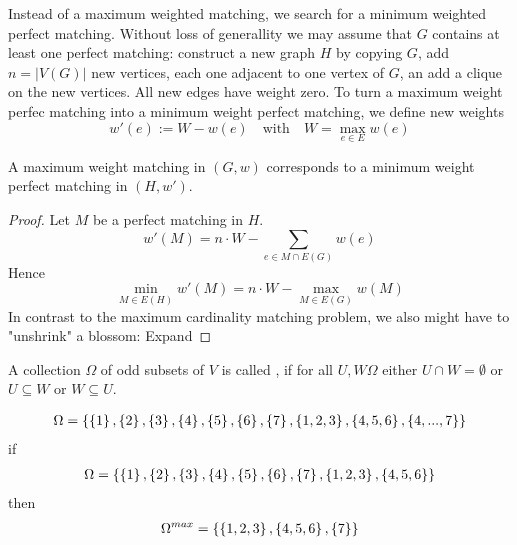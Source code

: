 \begin{lec}[2011-11-24]\end{lec}

Instead of a maximum weighted matching, we search for a minimum weighted perfect matching. Without loss of generallity we may assume that $G$ contains at least one perfect matching: construct a new graph $H$ by copying $G$, add $n=|V(G)|$ new vertices, each one adjacent to one vertex of $G$, an add a clique on the new vertices. All new edges have weight zero. To turn a maximum weight perfec matching into a minimum weight perfect matching, we define new weights  \[w'(e):=W-w(e) \quad\text{with}\quad W = \max_{e\in E} w(e) \]
\begin{lem}
	A maximum weight matching in $(G,w)$ corresponds to a minimum weight perfect matching in $(H,w')$.
\end{lem}

\begin{proof}
	Let $M$ be a perfect matching in $H$.
	\[
		w'(M)= n \cdot W - \sum\limits_{e \in M \cap E(G)} w(e)
	\]
	Hence
	\[ 
		\min_{M \in E(H)} w'(M) = n \cdot W - \max_{M \in E(G)} w(M)
	\]
	In contrast to the maximum cardinality matching problem, we also might have to "unshrink" a blossom: Expand
\end{proof}

\begin{defn}
	 A collection $\Omega$ of odd subsets of $V$ is called , if for all $U,W \Omega$ either $U\cap W = \emptyset$ or $U \subseteq W$ or $W \subseteq U$.
\end{defn}

\begin{xmp+}
	\begin{align*}
		\Omega =  \left\{\left\{1\right\}, \left\{2\right\}, \left\{3\right\}, \left\{4\right\}, \left\{5\right\}, \left\{6\right\}, \left\{7\right\}, \left\{1,2,3\right\}, \left\{4,5,6\right\}, \left\{4, ..., 7\right\}\right\}
	\end{align*}
	if
	\begin{align*}
		\Omega =  \left\{\left\{1\right\}, \left\{2\right\}, \left\{3\right\}, \left\{4\right\}, \left\{5\right\}, \left\{6\right\}, \left\{7\right\}, \left\{1,2,3\right\}, \left\{4,5,6\right\}\right\}
	\end{align*}
	then 
	\begin{align*}
		\Omega^{max} =  \left\{\left\{1,2,3\right\}, \left\{4,5,6\right\}, \left\{7\right\}\right\}
	\end{align*}
\end{xmp+}

